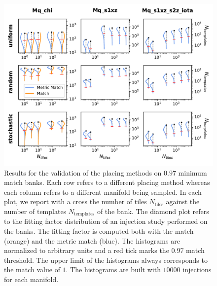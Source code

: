 \documentclass[twocolumn,showpacs,preprintnumbers,nofootinbib,prd,
superscriptaddress,10pt]{revtex4-2}
\begin{document}
\begin{figure}[th!]
	\centering
	\includegraphics[width=.85\textwidth,keepaspectratio]{placing_validation}
	\caption{Results for the validation of the placing methods on $0.97$ minimum match banks. Each row refers to a different placing method whereas each column refers to a different manifold being sampled. In each plot, we report with a cross the number of tiles $N_{\text{tiles}}$ against the number of templates $N_{\text{templates}}$ of the bank.
	The diamond plot refers to the fitting factor distribution of an injection study performed on the banks. The fitting factor is computed both with the match (orange) and the metric match (blue). The histograms are normalized to arbitrary units and a red tick marks the $0.97$ match threshold. The upper limit of the histograms always corresponds to the match value of $1$.
	The histograms are built with $10000$ injections for each manifold.
	}
	\label{fig:placing_validation}
\end{figure}
\end{document}
